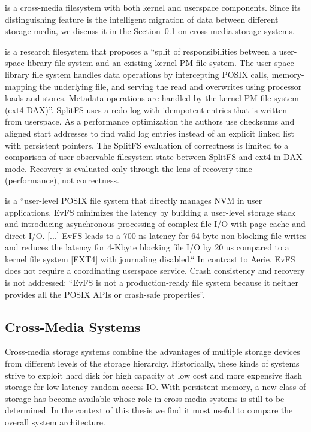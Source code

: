 \documentclass[12pt,a4paper,twoside]{book}
\begin{document}
 is a cross-media filesystem with both kernel and userspace components.
Since its distinguishing feature is the intelligent migration of data between different storage media, we discuss it in the Section~\ref{sec:cross_media_storage_systems} on cross-media storage systems.

 is a research filesystem that proposes a
“split of responsibilities between a user-space library file system and an existing kernel PM file system.
The user-space library file system handles data operations by intercepting POSIX calls, memory-mapping the underlying file, and serving the read and overwrites using processor loads and stores.
Metadata operations are handled by the kernel PM file system (ext4 DAX)”.
SplitFS uses a redo log with idempotent entries that is written from userspace.
As a performance optimization the authors use checksums and aligned start addresses to find valid log entries instead of an explicit linked list with persistent pointers.
The SplitFS evaluation of correctness is limited to a comparison of user-observable filesystem state between SplitFS and ext4 in DAX mode.
Recovery is evaluated only through the lens of recovery time (performance), not correctness.

 is a
“user-level POSIX file system that directly manages NVM in user applications.
EvFS minimizes the latency by building a user-level storage stack and introducing asynchronous processing of complex file I/O with page cache and direct I/O.
[...]
EvFS leads to a 700-ns latency for 64-byte non-blocking file writes and reduces the latency for 4-Kbyte blocking file I/O by 20 us compared to a kernel file system [EXT4] with journaling disabled.“
In contrast to Aerie, EvFS does not require a coordinating userspace service.
Crash consistency and recovery is not addressed:
“EvFS is not a production-ready file system because it neither provides all the POSIX APIs or crash-safe properties”.

\subsection{Cross-Media Systems}\label{sec:cross_media_storage_systems}
Cross-media storage systems combine the advantages of multiple storage devices from different levels of the storage hierarchy.
Historically, these kinds of systems strive to exploit hard disk for high capacity at low cost and more expensive flash storage for low latency random access IO.
With persistent memory, a new class of storage has become available whose role in cross-media systems is still to be determined.
In the context of this thesis we find it most useful to compare the overall system architecture.
\end{document}
